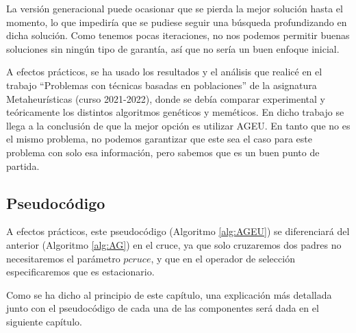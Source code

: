 La versión generacional puede ocasionar que se pierda la mejor solución hasta el momento, lo que impediría que se pudiese seguir una búsqueda profundizando en dicha solución. 
Como tenemos pocas iteraciones, no nos podemos permitir buenas soluciones sin ningún tipo de garantía, así que no sería un buen enfoque inicial. 


A efectos prácticos, se ha usado los resultados y el análisis que realicé en el trabajo ``Problemas con técnicas basadas en poblaciones'' de la asignatura Metaheurísticas (curso 2021-2022), donde se debía comparar experimental y teóricamente los distintos algoritmos genéticos y meméticos. 
En dicho trabajo se llega a la conclusión de que la mejor opción es utilizar AGEU. 
En tanto que no es el mismo problema, no podemos garantizar que este sea el caso para este problema con solo esa información, pero sabemos que es un buen punto de partida.

\subsection{Pseudocódigo}

A efectos prácticos, este pseudocódigo (Algoritmo \ref{alg:AGEU}) se diferenciará del anterior (Algoritmo \ref{alg:AG}) en el cruce, ya que solo cruzaremos dos padres no necesitaremos el parámetro $pcruce$, y que en el operador de selección especificaremos que es estacionario. 

Como se ha dicho al principio de este capítulo, una explicación más detallada junto con el pseudocódigo de cada una de las componentes será dada en el siguiente capítulo.


